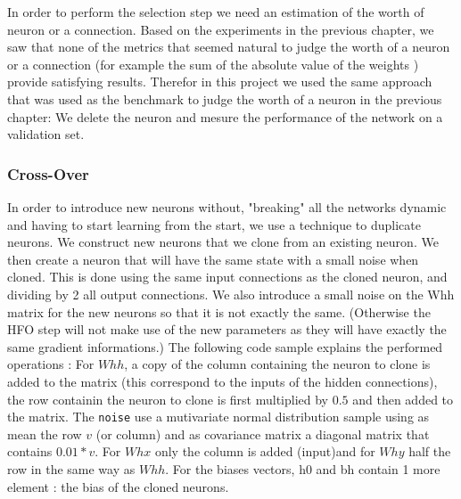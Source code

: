 In order to perform the selection step we need an estimation of the worth of neuron or a connection. Based on the experiments in the previous chapter, we saw that none of the metrics that seemed natural to judge the worth of a neuron or a connection (for example the sum of the absolute value of the weights ) provide satisfying results. Therefor in this project we used the same approach that was used as the benchmark to judge the worth of a neuron in the previous chapter: We delete the neuron and mesure the performance of the network on a validation set. 

\subsubsection{Cross-Over}

In order to introduce new neurons without, "breaking" all the networks dynamic and having to start learning from the start, we use a technique to duplicate neurons. We construct new neurons that we clone from an existing neuron. We then create a neuron that will have the same state with a small noise when cloned. This is done using the same input connections as the cloned neuron, and dividing by 2 all output connections. We also introduce a small noise on the Whh matrix for the new neurons so that it is not exactly the same. (Otherwise the HFO step will not make use of the new parameters as they will have exactly the same gradient informations.) The following code sample explains the performed operations : For $Whh$, a copy of the column containing the neuron to clone is added to the matrix (this correspond to the inputs of the hidden connections), the row containin the neuron to clone is first multiplied by $0.5$ and then added to the matrix. The \verb?noise? use a mutivariate normal distribution sample using as mean the row $v$ (or column) and as covariance matrix a diagonal matrix that contains $0.01 * v$. For $Whx$ only the column is added (input)and for $Why$ half the row in the same way as $Whh$. For the biases vectors, h0 and bh contain 1 more element : the bias of the cloned neurons. 

